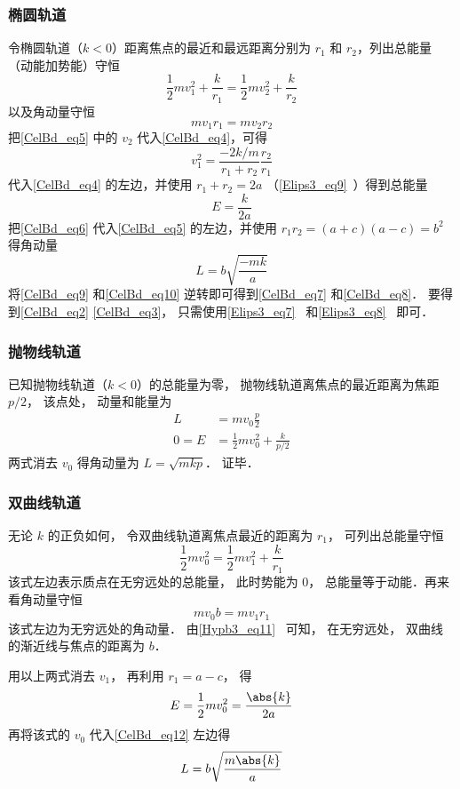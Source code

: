 \subsubsection{椭圆轨道}
令椭圆轨道（$k<0$）距离焦点的最近和最远距离分别为 $r_1$ 和 $r_2$，列出总能量（动能加势能）守恒
\begin{equation}\label{CelBd_eq4}
\frac12 m v_1^2 + \frac{k}{r_1} = \frac12 mv_2^2 + \frac{k}{r_2}
\end{equation}
以及角动量守恒
\begin{equation}\label{CelBd_eq5}
mv_1 r_1 = mv_2 r_2
\end{equation}
把\autoref{CelBd_eq5} 中的 $v_2$ 代入\autoref{CelBd_eq4}，可得
\begin{equation}\label{CelBd_eq6}
v_1^2 = \frac{-2k/m}{r_1 + r_2} \frac{r_2}{r_1}
\end{equation}
代入\autoref{CelBd_eq4} 的左边，并使用 $r_1+r_2=2a$ （\autoref{Elips3_eq9}~）得到总能量
\begin{equation}\label{CelBd_eq9}
E = \frac{k}{2a}
\end{equation}
把\autoref{CelBd_eq6} 代入\autoref{CelBd_eq5} 的左边，并使用 $r_1 r_2 = (a+c)(a-c) =b^2$ %
得角动量
\begin{equation}\label{CelBd_eq10}
L = b\sqrt{\frac{-mk}{a}}
\end{equation}
将\autoref{CelBd_eq9} 和\autoref{CelBd_eq10} 逆转即可得到\autoref{CelBd_eq7} 和\autoref{CelBd_eq8}． 要得到\autoref{CelBd_eq2} \autoref{CelBd_eq3}， 只需使用\autoref{Elips3_eq7}~ 和\autoref{Elips3_eq8}~ 即可．

\subsubsection{抛物线轨道}
已知抛物线轨道（$k<0$）的总能量为零， 抛物线轨道离焦点的最近距离为焦距 $p/2$， 该点处， 动量和能量为
\begin{align}
L &= mv_0 \frac p2\\
0 = E &= \frac 12 mv_0^2 + \frac{k}{p/2}
\end{align}
两式消去 $v_0$ 得角动量为 $L = \sqrt{mkp}$． 证毕．

\subsubsection{双曲线轨道}
无论 $k$ 的正负如何， 令双曲线轨道离焦点最近的距离为 $r_1$， 可列出总能量守恒
\begin{equation}\label{CelBd_eq11}
\frac12 mv_0^2 = \frac12 mv_1^2 + \frac{k}{r_1}
\end{equation}
该式左边表示质点在无穷远处的总能量， 此时势能为 $0$， 总能量等于动能．再来看角动量守恒
\begin{equation}\label{CelBd_eq12}
m v_0 b = m v_1 r_1
\end{equation}
该式左边为无穷远处的角动量． 由\autoref{Hypb3_eq11}~ 可知， 在无穷远处， 双曲线的渐近线与焦点的距离为 $b$．

用以上两式消去 $v_1$， 再利用 $r_1 = a - c$， 得
\begin{equation}\label{CelBd_eq13}
E = \frac 12 m v_0^2 = \frac{\abs{k}}{2a}
\end{equation}
再将该式的 $v_0$ 代入\autoref{CelBd_eq12} 左边得
\begin{equation}
L = b\sqrt{\frac{m\abs{k}}{a}}
\end{equation}
